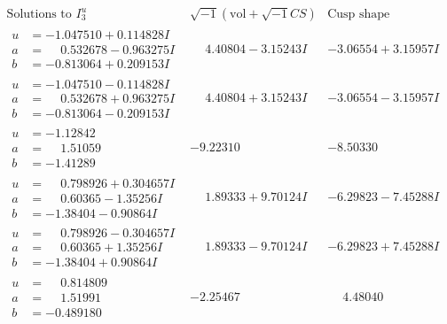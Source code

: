 \documentclass[1p]{elsarticle_modified}
\theoremstyle{definition}
\newcommand{\I}{\sqrt{-1}}
\begin{document}
$$\begin{array}{c|c|c}  
\text{Solutions to }I^u_{3}& \I (\text{vol} + \sqrt{-1}CS) & \text{Cusp shape}\\
 \hline 
\begin{aligned}
u &= -1.047510 + 0.114828 I \\
a &= \phantom{-}0.532678 - 0.963275 I \\
b &= -0.813064 + 0.209153 I\end{aligned}
 & \phantom{-}4.40804 - 3.15243 I & -3.06554 + 3.15957 I \\ \hline\begin{aligned}
u &= -1.047510 - 0.114828 I \\
a &= \phantom{-}0.532678 + 0.963275 I \\
b &= -0.813064 - 0.209153 I\end{aligned}
 & \phantom{-}4.40804 + 3.15243 I & -3.06554 - 3.15957 I \\ \hline\begin{aligned}
u &= -1.12842\phantom{ +0.000000I} \\
a &= \phantom{-}1.51059\phantom{ +0.000000I} \\
b &= -1.41289\phantom{ +0.000000I}\end{aligned}
 & -9.22310\phantom{ +0.000000I} & -8.50330\phantom{ +0.000000I} \\ \hline\begin{aligned}
u &= \phantom{-}0.798926 + 0.304657 I \\
a &= \phantom{-}0.60365 - 1.35256 I \\
b &= -1.38404 - 0.90864 I\end{aligned}
 & \phantom{-}1.89333 + 9.70124 I & -6.29823 - 7.45288 I \\ \hline\begin{aligned}
u &= \phantom{-}0.798926 - 0.304657 I \\
a &= \phantom{-}0.60365 + 1.35256 I \\
b &= -1.38404 + 0.90864 I\end{aligned}
 & \phantom{-}1.89333 - 9.70124 I & -6.29823 + 7.45288 I \\ \hline\begin{aligned}
u &= \phantom{-}0.814809\phantom{ +0.000000I} \\
a &= \phantom{-}1.51991\phantom{ +0.000000I} \\
b &= -0.489180\phantom{ +0.000000I}\end{aligned}
 & -2.25467\phantom{ +0.000000I} & \phantom{-}4.48040\phantom{ +0.000000I} \\ \hline\begin{aligned}

\end{aligned}
\end{array}$$
\end{document}
